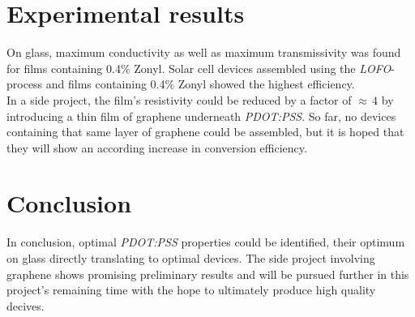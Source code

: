 \documentclass[a4paper,10pt]{article}
\begin{document}
\section*{Experimental results}
On glass, maximum conductivity as well as maximum transmissivity was found for films containing 0.4\% Zonyl. Solar cell devices assembled using the \emph{LOFO}-process and films containing 0.4\% Zonyl showed the highest efficiency.\\
In a side project, the film's resistivity could be reduced by a factor of $\approx \, 4$ by introducing a thin film of graphene underneath \emph{PDOT:PSS}. So far, no devices containing that same layer of graphene could be assembled, but it is hoped that they will show an according increase in conversion efficiency. 
\section*{Conclusion}
In conclusion, optimal \emph{PDOT:PSS} properties could be identified, their optimum on glass directly translating to optimal devices. %
The side project involving graphene shows promising preliminary results and will be pursued further in this project's remaining time with the hope to ultimately produce high quality decives.
\end{document}
